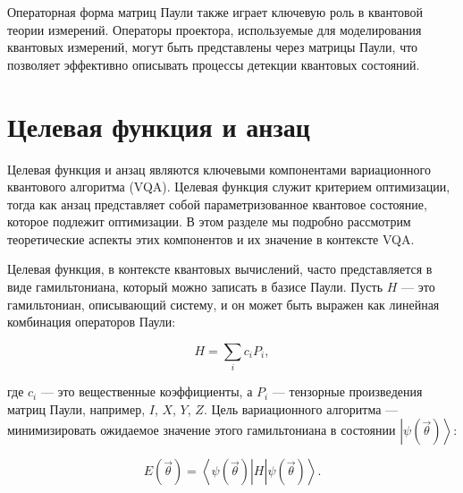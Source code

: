 \documentclass[a4paper]{report}
\newcommand{\ket}[1] {{\ensuremath{\left|#1\right\rangle}}}
\newcommand{\bra}[1] {{\ensuremath{\left\langle#1\right|}}}
\begin{document}
Операторная форма матриц Паули также играет ключевую роль в квантовой теории измерений. Операторы проектора, используемые для моделирования квантовых измерений, могут быть представлены через матрицы Паули, что позволяет эффективно описывать процессы детекции квантовых состояний.


\section{Целевая функция и анзац}

Целевая функция и анзац являются ключевыми компонентами вариационного квантового алгоритма (VQA). Целевая функция служит критерием оптимизации, тогда как анзац представляет собой параметризованное квантовое состояние, которое подлежит оптимизации. В этом разделе мы подробно рассмотрим теоретические аспекты этих компонентов и их значение в контексте VQA.

Целевая функция, в контексте квантовых вычислений, часто представляется в виде гамильтониана, который можно записать в базисе Паули. Пусть $H$ — это гамильтониан, описывающий систему, и он может быть выражен как линейная комбинация операторов Паули:

\begin{equation}
H = \sum_i c_i P_i,
\end{equation}

где $c_i$ — это вещественные коэффициенты, а $P_i$ — тензорные произведения матриц Паули, например, $I$, $X$, $Y$, $Z$. Цель вариационного алгоритма — минимизировать ожидаемое значение этого гамильтониана в состоянии $\ket{\psi(\vec{\theta})}$:

\begin{equation}
E(\vec{\theta}) = \bra{\psi(\vec{\theta})} H \ket{\psi(\vec{\theta})}.
\end{equation}
\end{document}
